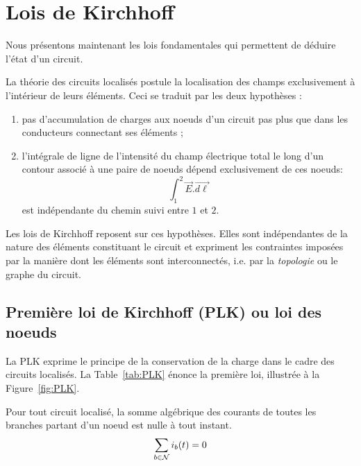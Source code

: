 \section{Lois de Kirchhoff}
\label{sec:LK}

Nous présentons maintenant les lois fondamentales qui permettent de déduire l'état d'un circuit.

La théorie des circuits localisés postule la localisation des champs exclusivement à l'intérieur de leurs éléments. Ceci se traduit par les deux hypothèses :
\begin{enumerate}
\item pas d'accumulation de charges aux noeuds d'un circuit pas plus que dans les conducteurs connectant ses éléments ;
\item  l'intégrale de ligne de l'intensité du champ électrique total le long d'un contour associé à une paire de noeuds dépend exclusivement de ces noeuds: 
$$\int_1^2 
\overrightarrow{E}. \overrightarrow{d\ell}$$ est indépendante du chemin suivi entre $1$ et $2$.
\end{enumerate}

Les lois de Kirchhoff reposent sur ces hypothèses. Elles sont indépendantes de la nature des éléments constituant le circuit et expriment les con\-traintes imposées par la manière dont les éléments sont interconnectés, i.e. par la {\em topologie} ou le graphe du circuit.

\subsection{Première loi de Kirchhoff (PLK) ou loi des noeuds}
La PLK exprime le principe de la conservation de la charge dans le cadre des
circuits localisés.
La Table~\ref{tab:PLK} énonce la première loi, illustrée à la Figure~\ref{fig:PLK}.
\begin{table}[h]
\caption{Première loi de Kirchhoff.\label{tab:PLK}}
\begin{boxedminipage}{\textwidth}
	{Pour tout circuit localisé, la somme algébrique des 
		courants de toutes les branches partant d'un noeud est nulle à
		tout instant.}
\begin{equation}
\sum_{b\in \cal{N}}i_b(t)=0 \label{eq:PLK}
\end{equation}
\end{boxedminipage}
\end{table}
\begin{marginfigure}
	\centering
	
	\caption{Première loi de Kirchhoff.\label{fig:PLK}}
\end{marginfigure}

